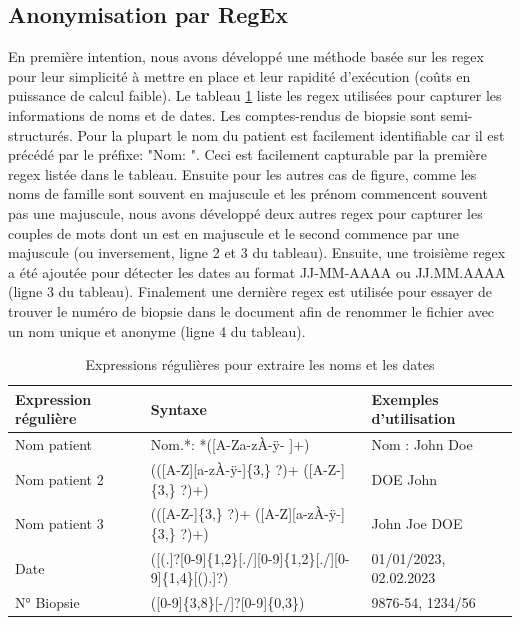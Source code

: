 \subsection{Anonymisation par RegEx}
En première intention, nous avons développé une méthode basée sur les \gls{regex} pour leur simplicité à mettre en place et leur rapidité d'exécution (coûts en puissance de calcul faible). Le tableau \ref{tab:regex} liste les \gls{regex} utilisées pour capturer les informations de noms et de dates. Les comptes-rendus de biopsie sont semi-structurés. Pour la plupart le nom du patient est facilement identifiable car il est précédé par le préfixe: "Nom: ". Ceci est facilement capturable par la première \gls{regex} listée dans le tableau. Ensuite pour les autres cas de figure, comme les noms de famille sont souvent en majuscule et les prénom commencent souvent pas une majuscule, nous avons développé deux autres \gls{regex} pour capturer les couples de mots dont un est en majuscule et le second commence par une majuscule (ou inversement, ligne 2 et 3 du tableau). 
Ensuite, une troisième \gls{regex} a été ajoutée pour détecter les dates au format JJ-MM-AAAA ou JJ.MM.AAAA (ligne 3 du tableau). Finalement une dernière \gls{regex} est utilisée pour essayer de trouver le numéro de biopsie dans le document afin de renommer le fichier avec un nom unique et anonyme (ligne 4 du tableau). 
\begin{table}[htbp]
\centering
\caption{Expressions régulières pour extraire les noms et les dates}
\label{tab:regex}
\begin{tabular}{|l|l|l|}
\hline
\textbf{Expression régulière} & \textbf{Syntaxe} & \textbf{Exemples d'utilisation} \\ \hline
Nom patient & Nom.*: *([A-Za-zÀ-ÿ- ]+) & Nom : John Doe \\ \hline
Nom patient 2& (([A-Z][a-zÀ-ÿ-]\{3,\} ?)+ ([A-Z-]\{3,\} ?)+) & DOE John \\ \hline
Nom patient 3 & (([A-Z-]\{3,\} ?)+ ([A-Z][a-zÀ-ÿ-]\{3,\} ?)+) & John Joe DOE \\ \hline
Date & ([(.]?[0-9]\{1,2\}[./][0-9]\{1,2\}[./][0-9]\{1,4\}[().]?) & 01/01/2023, 02.02.2023 \\ \hline
N° Biopsie & ([0-9]\{3,8\}[-/]?[0-9]\{0,3\}) & 9876-54, 1234/56 \\ \hline
\end{tabular}
\end{table}
